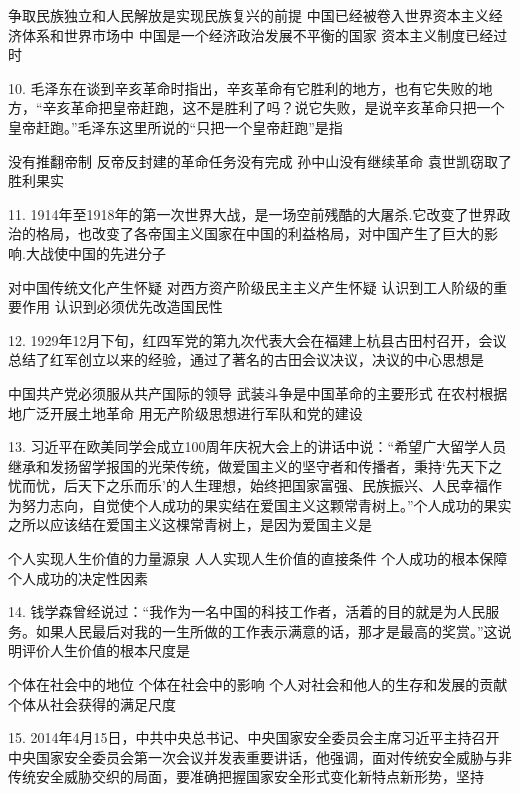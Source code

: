 \begin{choices}
	 争取民族独立和人民解放是实现民族复兴的前提
	 中国已经被卷入世界资本主义经济体系和世界市场中
	 中国是一个经济政治发展不平衡的国家
	 资本主义制度已经过时
\end{choices}
10. 毛泽东在谈到辛亥革命时指出，辛亥革命有它胜利的地方，也有它失败的地方，“辛亥革命把皇帝赶跑，这不是胜利了吗？说它失败，是说辛亥革命只把一个皇帝赶跑。”毛泽东这里所说的“只把一个皇帝赶跑”是指
\begin{choices}
	 没有推翻帝制
	 反帝反封建的革命任务没有完成
	 孙中山没有继续革命
	 袁世凯窃取了胜利果实
\end{choices}
11. 1914年至1918年的第一次世界大战，是一场空前残酷的大屠杀.它改变了世界政治的格局，也改变了各帝国主义国家在中国的利益格局，对中国产生了巨大的影响.大战使中国的先进分子
\begin{choices}
	 对中国传统文化产生怀疑
	 对西方资产阶级民主主义产生怀疑
	 认识到工人阶级的重要作用
	 认识到必须优先改造国民性
\end{choices}
12. 1929年12月下旬，红四军党的第九次代表大会在福建上杭县古田村召开，会议总结了红军创立以来的经验，通过了著名的古田会议决议，决议的中心思想是
\begin{choices}
	 中国共产党必须服从共产国际的领导
	 武装斗争是中国革命的主要形式
	 在农村根据地广泛开展土地革命
	 用无产阶级思想进行军队和党的建设
\end{choices}
13. 习近平在欧美同学会成立100周年庆祝大会上的讲话中说：“希望广大留学人员继承和发扬留学报国的光荣传统，做爱国主义的坚守者和传播者，秉持‘先天下之忧而忧，后天下之乐而乐’的人生理想，始终把国家富强、民族振兴、人民幸福作为努力志向，自觉使个人成功的果实结在爱国主义这颗常青树上。”个人成功的果实之所以应该结在爱国主义这棵常青树上，是因为爱国主义是
\begin{choices}
	 个人实现人生价值的力量源泉
	 人人实现人生价值的直接条件
	 个人成功的根本保障
	 个人成功的决定性因素
\end{choices}
14. 钱学森曾经说过：“我作为一名中国的科技工作者，活着的目的就是为人民服务。如果人民最后对我的一生所做的工作表示满意的话，那才是最高的奖赏。”这说明评价人生价值的根本尺度是
\begin{choices}
	 个体在社会中的地位
	 个体在社会中的影响
	 个人对社会和他人的生存和发展的贡献
	 个体从社会获得的满足尺度
\end{choices}
15. 2014年4月15日，中共中央总书记、中央国家安全委员会主席习近平主持召开中央国家安全委员会第一次会议并发表重要讲话，他强调，面对传统安全威胁与非传统安全威胁交织的局面，要准确把握国家安全形式变化新特点新形势，坚持
